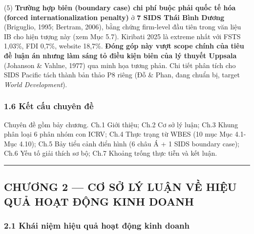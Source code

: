 \documentclass[12pt,a4paper]{article}
\begin{document}
(5) \textbf{Trường hợp biên (boundary case) chi phí buộc phải quốc tế
hóa (forced internationalization penalty)} ở \textbf{7 SIDS Thái Bình
Dương} (Briguglio, 1995; Bertram, 2006), bằng chứng firm-level đầu tiên
trong văn liệu IB cho hiện tượng này (xem Mục 5.7). Kiribati 2025 là
extreme nhất với FSTS 1,03\%, FDI 0,7\%, website 18,7\%. \textbf{Đóng
góp này vượt scope chính của tiêu đề luận án nhưng làm sáng tỏ điều kiện
biên của lý thuyết Uppsala} (Johanson \& Vahlne, 1977) qua minh họa
tương phản. Chi tiết phân tích cho SIDS Pacific tách thành bản thảo P8
riêng (Đỗ \& Phan, đang chuẩn bị, target \emph{World Development}).

\hypertarget{16-kux1ebft-cux1ea5u-chuyuxean-ux111ux1ec1}{%
\subsubsection{1.6 Kết cấu chuyên
đề}\label{16-kux1ebft-cux1ea5u-chuyuxean-ux111ux1ec1}}

Chuyên đề gồm bảy chương. Ch.1 Giới thiệu; Ch.2 Cơ sở lý luận; Ch.3
Khung phân loại 6 phân nhóm con ICRV; Ch.4 Thực trạng từ WBES (10 mục
Mục 4.1-Mục 4.10); Ch.5 Bảy tiểu cảnh điển hình (6 châu Á + 1 SIDS
boundary case); Ch.6 Yếu tố giải thích sơ bộ; Ch.7 Khoảng trống thực
tiễn và kết luận.

\begin{center}\rule{0.5\linewidth}{0.5pt}\end{center}

\hypertarget{chux1b0ux1a1ng-2--cux1a1-sux1edf-luxfd-luux1eadn-vux1ec1-hiux1ec7u-quux1ea3-houx1ea1t-ux111ux1ed9ng-kinh-doanh}{%
\subsection{CHƯƠNG 2 --- CƠ SỞ LÝ LUẬN VỀ HIỆU QUẢ HOẠT ĐỘNG KINH
DOANH}\label{chux1b0ux1a1ng-2--cux1a1-sux1edf-luxfd-luux1eadn-vux1ec1-hiux1ec7u-quux1ea3-houx1ea1t-ux111ux1ed9ng-kinh-doanh}}

\hypertarget{21-khuxe1i-niux1ec7m-hiux1ec7u-quux1ea3-houx1ea1t-ux111ux1ed9ng-kinh-doanh}{%
\subsubsection{2.1 Khái niệm hiệu quả hoạt động kinh
doanh}\label{21-khuxe1i-niux1ec7m-hiux1ec7u-quux1ea3-houx1ea1t-ux111ux1ed9ng-kinh-doanh}}
\end{document}
